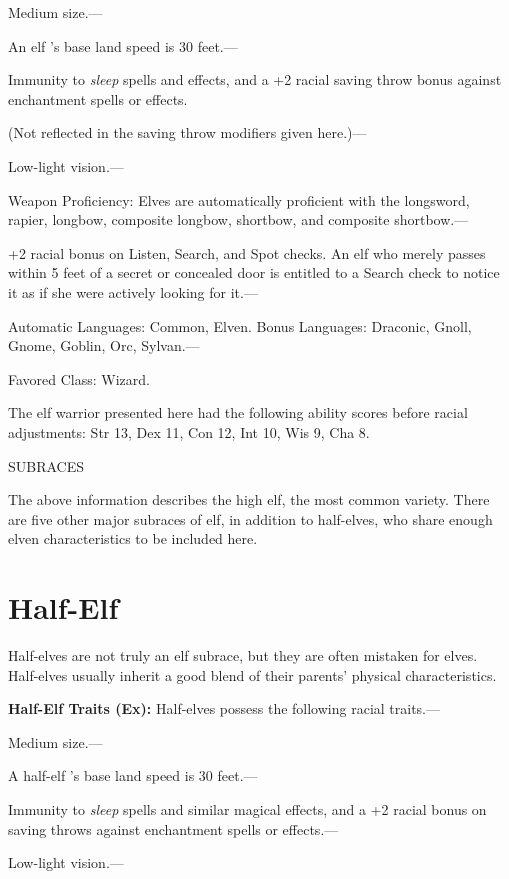 \documentclass{article}
\begin{document}
\parindent=0pt
Medium size.---

An elf 's base land speed is 30 feet.---

Immunity to \textit{sleep }spells and effects, and a +2 racial saving throw bonus 
against enchantment spells or effects.

(Not reflected in the saving throw modifiers given here.)---

Low-light vision.---

Weapon Proficiency: Elves are automatically proficient with the longsword, rapier, 
longbow, composite longbow, shortbow, and composite shortbow.--- 

\parindent=3pt
+2 racial bonus on Listen, Search, and Spot checks. An elf who merely passes within 
5 feet of a secret or concealed door is entitled to a Search check to notice it 
as if she were actively looking for it.---

\parindent=0pt
Automatic Languages: Common, Elven. Bonus Languages: Draconic, Gnoll, Gnome, Goblin, 
Orc, Sylvan.---

Favored Class: Wizard.

The elf warrior presented here had the following ability scores before racial adjustments: 
Str 13, Dex 11, Con 12, Int 10, Wis 9, Cha 8.

SUBRACES

The above information describes the high elf, the most common variety. There are 
five other major subraces of elf, in addition to half-elves, who share enough elven 
characteristics to be included here.

\vspace{12pt}
\section*{\textbf{Half-Elf}}

Half-elves are not truly an elf subrace, but they are often mistaken for elves. 
Half-elves usually inherit a good blend of their parents' physical characteristics.

\textbf{Half-Elf Traits (Ex): }Half-elves possess the following racial traits.---

Medium size.---

A half-elf 's base land speed is 30 feet.---

Immunity to \textit{sleep }spells and similar magical effects, and a +2 racial 
bonus on saving throws against enchantment spells or effects.---

Low-light vision.--- 
\end{document}
